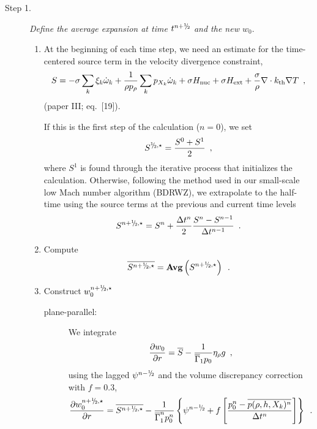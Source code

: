 \begin{description}

\item[Step 1.] {\em Define the average expansion at time $t^\nph$ and the new $w_0.$}

\begin{enumerate}
\renewcommand{\theenumi}{{\bf \alph{enumi}}}

\item At the beginning of each time step, we need an estimate for the time-centered
source term in the velocity divergence constraint,
\begin{equation}
  S =  -\sigma  \sum_k  \xi_k \dot{\omega}_k  + 
  \frac{1}{\rho p_\rho} \sum_k p_{X_k}  {\dot{\omega}}_k  + \sigma {H_{\rm nuc}} + \sigma {H_{\rm ext}} 
  + \frac{\sigma}{\rho}\nabla\cdot k_{\rm th}\nabla T \enskip ,
\label{eq:defineS} 
\end{equation}
(paper III; eq.~[19]).

If this is the first step of the calculation ($n=0$), we set
\begin{equation}
S^{\myhalf,\star} = \frac{S^0 + S^1}{2} \enskip ,
\end{equation}
where $S^1$ is found through the iterative process that initializes the calculation.
Otherwise, following the method used in our small-scale low Mach number algorithm
(BDRWZ), we extrapolate to the half-time using the source
terms at the previous and current time levels
\begin{equation}
S^{\nph,\star} = S^n + \frac{\Delta t^n}{2} \frac{S^n - S^{n-1}}{\Delta t^{n-1}} \enskip .
\end{equation}

\item Compute
\begin{equation}
\overline{S^{\nph,\star}} = {\mathrm{\bf Avg}} \left(S^{\nph,\star}\right) \enskip .
\end{equation}

\item Construct $w_0^{\nph,\star}$

\begin{description}

\item[plane-parallel:] We integrate
\begin{equation}
\frac{\partial w_0}{\partial r} =  \overline{S} - \frac{1}{\overline{\Gamma}_1 p_0} \eta_{\rho} g 
\enskip \label{eq:divw0} ,
\end{equation}
using the lagged $\psi^{\nmh}$ and the volume discrepancy correction with $f=0.3$,
\begin{equation}
\frac{\partial w_0^{\nph,\star}}{\partial r} =  \overline{S^{\nph,\star}}
- \frac{1}{\gammabar^{n} p_0^{n}}
\left\{ \psi^{\nmh} + 
f \left[\frac{p_0^n - \overline{p(\rho,h,X_k)^n}}{\Delta t^n} \right]\right\}
\enskip .
\end{equation}


\end{description}
\end{enumerate}
\end{description}
